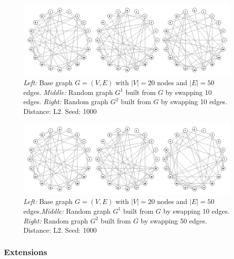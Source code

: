\begin{figure}[htb]
	\begin{center}
		\includegraphics[width=1\linewidth]{ch-gc/figures/sim_10vs10}
		\caption[Random graphs with 20 nodes and 50 edges. Edges have been 
		swapped 10 times each.]{\textit{Left:} Base graph $G=(V,E)$ with 
		$|V|=20$ nodes and $|E|=50$ edges. 
		\textit{Middle:} Random graph $G^1$ built from $G$ by swapping 
		10 edges. \textit{Right:} Random graph $G^2$ built from $G$ by 
		swapping 10 edges. Distance: L2. Seed: 1000}
		\label{fig:gc:sim10vs10}
	\end{center}
\end{figure}

\begin{figure}[htb]
	\begin{center}
		\includegraphics[width=1\linewidth]{ch-gc/figures/sim_10vs50}
		\caption[Random graphs with 20 nodes and 50 edges. Edges have been 
		swapped 10 and 50 times, respectively.]{\textit{Left:} Base graph 
		$G=(V,E)$ with $|V|=20$ nodes and $|E|=50$ edges.\textit{Middle:} 
		Random graph $G^1$ built from $G$ by swapping 10 edges. 
		\textit{Right:} Random graph $G^2$ built from $G$ by swapping 
		50 edges. Distance: L2. Seed: 1000}
		\label{fig:gc:sim10vs50}
	\end{center}
\end{figure}

\subsubsection{Extensions}

